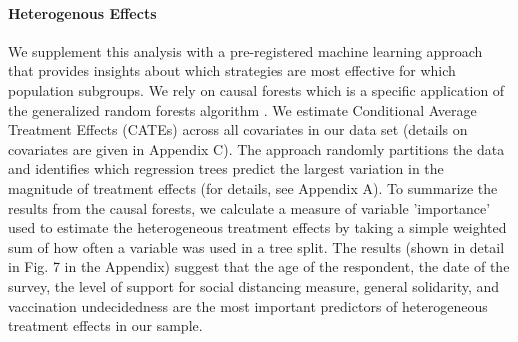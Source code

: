 \documentclass[12pt]{article}
\renewcommand\hl[1]{#1}
\begin{document}
\paragraph*{Heterogenous Effects} We supplement this analysis with a pre-registered machine learning approach \hl{that provides insights about which strategies are most effective for which population subgroups.}   We rely on causal forests \cite{wager2018estimation,athey2016recursive} which is a specific application of the generalized random forests algorithm \cite{athey2019generalized}. We estimate Conditional Average Treatment Effects (CATEs) across all covariates in our data set (details on covariates are given in Appendix C). The approach randomly partitions the data and identifies which regression trees predict the largest variation in the magnitude of treatment effects (for details, see Appendix A). To summarize the results from the causal forests, we calculate a measure of variable 'importance' used to estimate the heterogeneous treatment effects by taking a simple weighted sum of how often a variable was used in a tree split. The results (shown in detail in Fig. 7 in the Appendix) suggest that the age of the respondent, the date of the survey, the level of support for social distancing measure, general solidarity, and vaccination undecidedness are the most important predictors of heterogeneous treatment effects in our sample.



\end{document}
